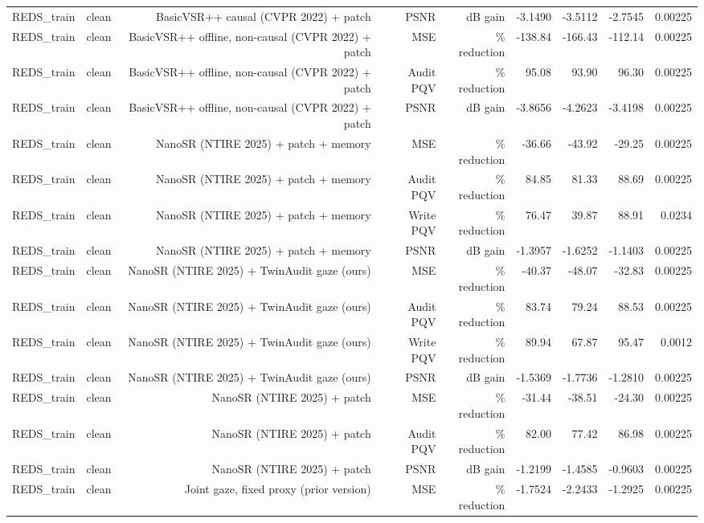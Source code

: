\begin{table}[t]
\begin{tabular}{llrrrrrrr}
REDS\_train & clean & BasicVSR++ causal (CVPR 2022) + patch & PSNR & dB gain & -3.1490 & -3.5112 & -2.7545 & 0.00225 \\
REDS\_train & clean & BasicVSR++ offline, non-causal (CVPR 2022) + patch & MSE & \% reduction & -138.84 & -166.43 & -112.14 & 0.00225 \\
REDS\_train & clean & BasicVSR++ offline, non-causal (CVPR 2022) + patch & Audit PQV & \% reduction & 95.08 & 93.90 & 96.30 & 0.00225 \\
REDS\_train & clean & BasicVSR++ offline, non-causal (CVPR 2022) + patch & PSNR & dB gain & -3.8656 & -4.2623 & -3.4198 & 0.00225 \\
REDS\_train & clean & NanoSR (NTIRE 2025) + patch + memory & MSE & \% reduction & -36.66 & -43.92 & -29.25 & 0.00225 \\
REDS\_train & clean & NanoSR (NTIRE 2025) + patch + memory & Audit PQV & \% reduction & 84.85 & 81.33 & 88.69 & 0.00225 \\
REDS\_train & clean & NanoSR (NTIRE 2025) + patch + memory & Write PQV & \% reduction & 76.47 & 39.87 & 88.91 & 0.0234 \\
REDS\_train & clean & NanoSR (NTIRE 2025) + patch + memory & PSNR & dB gain & -1.3957 & -1.6252 & -1.1403 & 0.00225 \\
REDS\_train & clean & NanoSR (NTIRE 2025) + TwinAudit gaze (ours) & MSE & \% reduction & -40.37 & -48.07 & -32.83 & 0.00225 \\
REDS\_train & clean & NanoSR (NTIRE 2025) + TwinAudit gaze (ours) & Audit PQV & \% reduction & 83.74 & 79.24 & 88.53 & 0.00225 \\
REDS\_train & clean & NanoSR (NTIRE 2025) + TwinAudit gaze (ours) & Write PQV & \% reduction & 89.94 & 67.87 & 95.47 & 0.0012 \\
REDS\_train & clean & NanoSR (NTIRE 2025) + TwinAudit gaze (ours) & PSNR & dB gain & -1.5369 & -1.7736 & -1.2810 & 0.00225 \\
REDS\_train & clean & NanoSR (NTIRE 2025) + patch & MSE & \% reduction & -31.44 & -38.51 & -24.30 & 0.00225 \\
REDS\_train & clean & NanoSR (NTIRE 2025) + patch & Audit PQV & \% reduction & 82.00 & 77.42 & 86.98 & 0.00225 \\
REDS\_train & clean & NanoSR (NTIRE 2025) + patch & PSNR & dB gain & -1.2199 & -1.4585 & -0.9603 & 0.00225 \\
REDS\_train & clean & Joint gaze, fixed proxy (prior version) & MSE & \% reduction & -1.7524 & -2.2433 & -1.2925 & 0.00225 \\

\end{tabular}
\end{table}
